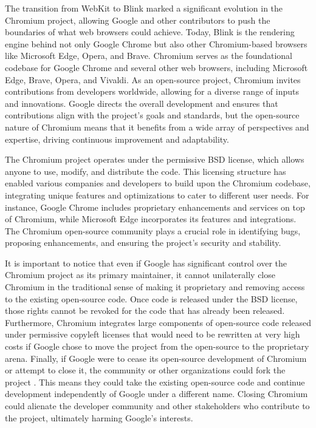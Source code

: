 \documentclass[CHICAGO,Times1COL]{WileyNJDv5} %
\begin{document}
The transition from WebKit to Blink marked a significant evolution in the Chromium project, allowing Google and other contributors to push the boundaries of what web browsers could achieve. Today, Blink is the rendering engine behind not only Google Chrome but also other Chromium-based browsers like Microsoft Edge, Opera, and Brave. Chromium serves as the foundational codebase for Google Chrome and several other web browsers, including Microsoft Edge, Brave, Opera, and Vivaldi. As an open-source project, Chromium invites contributions from developers worldwide, allowing for a diverse range of inputs and innovations. Google directs the overall development and ensures that contributions align with the project's goals and standards, but the open-source nature of Chromium means that it benefits from a wide array of perspectives and expertise, driving continuous improvement and adaptability.

The Chromium project operates under the permissive BSD license, which allows anyone to use, modify, and distribute the code. This licensing structure has enabled various companies and developers to build upon the Chromium codebase, integrating unique features and optimizations to cater to different user needs. For instance, Google Chrome includes proprietary enhancements and services on top of Chromium, while Microsoft Edge incorporates its features and integrations. The Chromium open-source community plays a crucial role in identifying bugs, proposing enhancements, and ensuring the project's security and stability. 

It is important to notice that even if Google has significant control over the Chromium project as its primary maintainer, it cannot unilaterally close Chromium in the traditional sense of making it proprietary and removing access to the existing open-source code. Once code is released under the BSD license, those rights cannot be revoked for the code that has already been released. Furthermore, Chromium integrates large components of open-source code released under permissive copyleft licenses that would need to be rewritten at very high costs if Google chose to move the project from the open-source to the proprietary arena.  Finally, if Google were to cease its open-source development of Chromium or attempt to close it, the community or other organizations could fork the project \citep[see][for academic discussions on the implications of the forking mechanism]{KarhuGustafsson_et_al2018,NymanLindman2013}. This means they could take the existing open-source code and continue development independently of Google under a different name.  Closing Chromium could alienate the developer community and other stakeholders who contribute to the project, ultimately harming Google’s interests.
\end{document}
